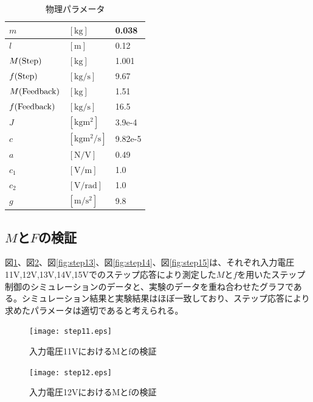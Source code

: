 \documentclass[a4j,11pt,twoside]{ujbook}
\begin{document}
\begin{table}[hbtp]
	\begin{center}
		\caption{物理パラメータ}
		\medskip
		\begin{tabular}{|ll|l|} \hline
			$m$ & $[\mathrm{kg}]$ & 0.038 \\ \hline
			$l$ & $[\mathrm{m}]$ & 0.12 \\ \hline
			$M(\rm{Step})$ & $[\mathrm{kg}]$ & 1.001 \\ \hline
			$f(\rm{Step})$ & $[\mathrm{kg/s}]$ & 9.67 \\ \hline
			$M(\rm{Feedback})$ & $[\mathrm{kg}]$ & 1.51 \\ \hline
			$f(\rm{Feedback})$ & $[\mathrm{kg/s}]$ & 16.5 \\ \hline
			$J$ & $[\mathrm{kgm^2}]$ & 3.9e-4 \\ \hline
			$c$ & $[\mathrm{kgm^2/s}]$ & 9.82e-5 \\ \hline
			$a$ & $[\mathrm{N/V}]$ & 0.49 \\ \hline
			$c_1$ & $[\mathrm{V/m}]$ & 1.0 \\ \hline
			$c_2$ & $[\mathrm{V/rad}]$ & 1.0 \\ \hline
			$g$ & $[\mathrm{m/s^2}]$ & 9.8 \\ \hline
		\end{tabular}
	\end{center}
\end{table}

	\subsection{$M$と$F$の検証}

	図\ref{fig:step11}、図\ref{fig:step12}、図\ref{fig:step13}、図\ref{fig:step14}、図\ref{fig:step15}は、それぞれ入力電圧11V,12V,13V,14V,15Vでのステップ応答により測定した$M$と$f$を用いたステップ制御のシミュレーションのデータと、実験のデータを重ね合わせたグラフである。シミュレーション結果と実験結果はほぼ一致しており、ステップ応答により求めたパラメータは適切であると考えられる。

	\begin{figure}[htbp]
		\begin{center}
			\texttt{[image: step11.eps]}
			\caption{入力電圧11VにおけるMとfの検証}
			\label{fig:step11}
		\end{center}
	\end{figure}

	\begin{figure}[htbp]
		\begin{center}
			\texttt{[image: step12.eps]}
			\caption{入力電圧12VにおけるMとfの検証}
			\label{fig:step12}
		\end{center}
	\end{figure}
	
\end{document}
